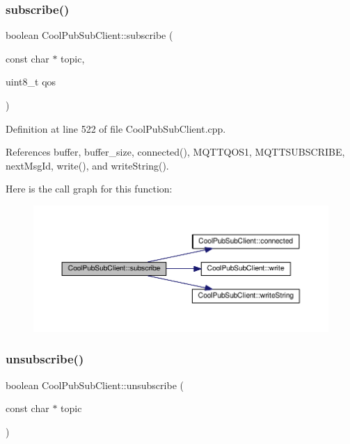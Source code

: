 \subsubsection{\texorpdfstring{subscribe()}{subscribe()}\hspace{0.1cm}{\footnotesize\ttfamily [2/2]}}
{\footnotesize\ttfamily boolean Cool\+Pub\+Sub\+Client\+::subscribe (\begin{DoxyParamCaption}\item[{const char $\ast$}]{topic,  }\item[{uint8\+\_\+t}]{qos }\end{DoxyParamCaption})}



Definition at line 522 of file Cool\+Pub\+Sub\+Client.\+cpp.



References buffer, buffer\+\_\+size, connected(), M\+Q\+T\+T\+Q\+O\+S1, M\+Q\+T\+T\+S\+U\+B\+S\+C\+R\+I\+BE, next\+Msg\+Id, write(), and write\+String().

Here is the call graph for this function\+:
\nopagebreak
\begin{figure}[H]
\begin{center}
\leavevmode
\includegraphics[width=350pt]{d8/d4b/class_cool_pub_sub_client_aebf684e98588c52a72af1014f7957bee_cgraph}
\end{center}
\end{figure}
\mbox{\label{class_cool_pub_sub_client_a850554280e314d6b5c33c73fd9e809fc}} 
\subsubsection{\texorpdfstring{unsubscribe()}{unsubscribe()}}
{\footnotesize\ttfamily boolean Cool\+Pub\+Sub\+Client\+::unsubscribe (\begin{DoxyParamCaption}\item[{const char $\ast$}]{topic }\end{DoxyParamCaption})}



